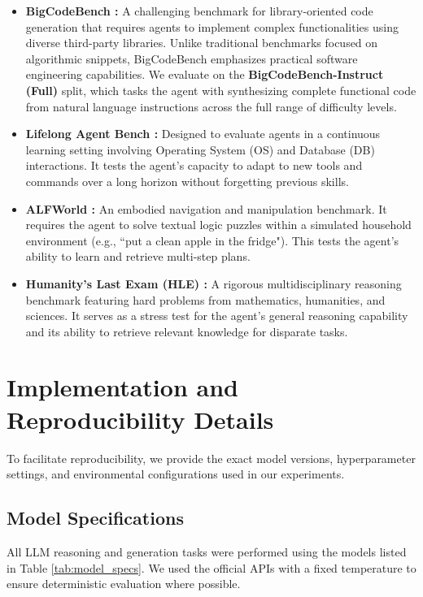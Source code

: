 \documentclass{article}
\theoremstyle{plain}
\theoremstyle{definition}
\theoremstyle{remark}
\begin{document}
\begin{itemize}
    \item \textbf{BigCodeBench \citep{zhuo2025bigcode}:} A challenging benchmark for library-oriented code generation that requires agents to implement complex functionalities using diverse third-party libraries. Unlike traditional benchmarks focused on algorithmic snippets, BigCodeBench emphasizes practical software engineering capabilities. We evaluate on the \textbf{BigCodeBench-Instruct (Full)} split, which tasks the agent with synthesizing complete functional code from natural language instructions across the full range of difficulty levels.

    \item \textbf{Lifelong Agent Bench \citep{zheng2025lifelong}:} Designed to evaluate agents in a continuous learning setting involving Operating System (OS) and Database (DB) interactions. It tests the agent's capacity to adapt to new tools and commands over a long horizon without forgetting previous skills.
    
    \item \textbf{ALFWorld \citep{shridhar2021alfworld}:} An embodied navigation and manipulation benchmark. It requires the agent to solve textual logic puzzles within a simulated household environment (e.g., ``put a clean apple in the fridge"). This tests the agent's ability to learn and retrieve multi-step plans.
    
    \item \textbf{Humanity's Last Exam (HLE) \citep{phan2025hle}:} A rigorous multidisciplinary reasoning benchmark featuring hard problems from mathematics, humanities, and sciences. It serves as a stress test for the agent's general reasoning capability and its ability to retrieve relevant knowledge for disparate tasks.
\end{itemize}



\section{Implementation and Reproducibility Details}
\label{app:impl}

To facilitate reproducibility, we provide the exact model versions, hyperparameter settings, and environmental configurations used in our experiments.

\subsection{Model Specifications}
All LLM reasoning and generation tasks were performed using the models listed in Table \ref{tab:model_specs}. We used the official APIs with a fixed temperature to ensure deterministic evaluation where possible.
\end{document}

